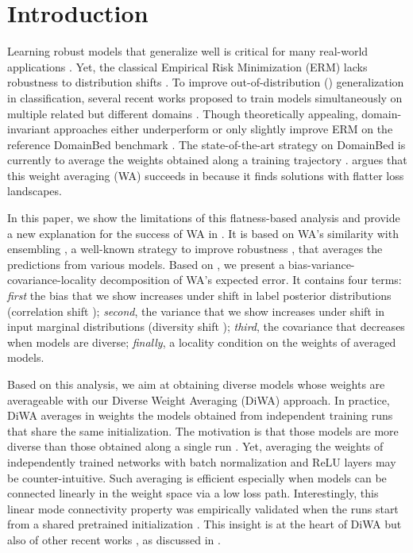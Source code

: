 \section{Introduction}
Learning robust models that generalize well is critical for many real-world applications \cite{Zech2018,degrave2021ai}.
Yet, the classical Empirical Risk Minimization (ERM) lacks robustness to distribution shifts \cite{hendrycks2018benchmarking,NEURIPS2020_6cfe0e61,d2020underspecification}.
To improve out-of-distribution (\ood) generalization in classification, several recent works proposed to train models simultaneously on multiple related but different domains \cite{muandet2013domain}.
Though theoretically appealing, domain-invariant approaches \cite{peters2016causal} either underperform \cite{arjovsky2019invariant,krueger2020utofdistribution} or only slightly improve \cite{coral216aaai,rame_fishr_2021} ERM on the reference DomainBed benchmark \cite{gulrajani2021in}.
The state-of-the-art strategy on DomainBed is currently to average the weights obtained along a training trajectory \cite{izmailov2018}.
\cite{cha2021wad} argues that this weight averaging (WA) succeeds in \ood because it finds solutions with flatter loss landscapes.

In this paper, we show the limitations of this flatness-based analysis and provide a new explanation for the success of WA in \ood.
It is based on WA's similarity with ensembling \cite{Lakshminarayanan2017}, a well-known strategy to improve robustness \cite{Ovadia2019,ashukha2020pitfalls}, that averages the predictions from various models.
Based on \cite{ueda1996generalization}, we present %
a bias-variance-covariance-locality decomposition of WA's expected error.
It contains four terms:
\textit{first} the bias that we show increases under shift in label posterior distributions (\ie correlation shift \cite{ye2021odbench});
\textit{second}, the variance that we show increases under shift in input marginal distributions (\ie diversity shift \cite{ye2021odbench});
\textit{third}, the covariance that decreases when models are diverse;
\textit{finally}, a locality condition on the weights of averaged models.

Based on this analysis, we aim at obtaining diverse models whose weights are averageable with our Diverse Weight Averaging (DiWA) approach.
In practice, DiWA averages in weights the models obtained from independent training runs that share the same initialization. The motivation is that those models are more diverse than those obtained along a single run \cite{Fort2019DeepEA,gontijolopes2022no}.
Yet, averaging the weights of independently trained networks with batch normalization \cite{batchnorm2015} and ReLU layers \cite{agarap2018deep} may be counter-intuitive.
Such averaging is efficient especially when models can be connected linearly in the weight space via a low loss path. Interestingly, this linear mode connectivity property \cite{Frankle2020} was empirically validated when the runs start from a shared pretrained initialization \cite{Neyshabur2020}.
This insight is at the heart of DiWA but also of other recent works \cite{Wortsman2022robust,mergefisher21,Wortsman2022ModelSA}, as discussed in .

